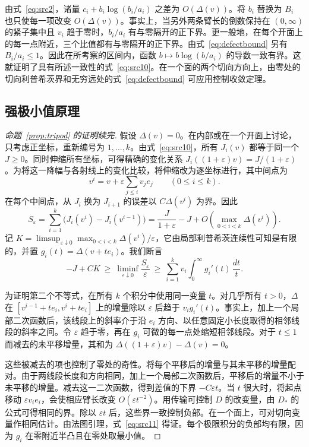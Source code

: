 由式~\eqref{eq:src2}，诸量 $c_i+b_i\log(b_i/a_i)$ 之差为 $O(\Delta(v))$。将 $b_i$ 替换为 $B_i$ 也只使每一项改变 $O(\Delta(v))$。事实上，当另外两条臂长的倒数保持在 $(0,\infty)$ 的紧子集中且 $v_i$ 趋于零时，$b_i/a_i$ 有与零隔开的正下界。更一般地，在每个开面上的每一点附近，三个比值都有与零隔开的正下界。由式~\eqref{eq:defectbound} 另有 $B_i/a_i\le1$。因此在所考察的区间内，函数 $b\mapsto b\log(b/a_i)$ 的导数一致有界。这就证明了具有所述一致性的式~\eqref{eq:src10}。在一个面的两个切向方向上，由零处的切向利普希茨界和无穷远处的式~\eqref{eq:defectbound} 可应用控制收敛定理。

\subsection{强极小值原理}

\begin{proof}[命题~\ref{prop:tripod} 的证明续完]
假设 $\Delta(v)=0$。在内部或在一个开面上讨论，只考虑正坐标，重新编号为 $1,\ldots,k$。由式~\eqref{eq:src10}，所有 $J_i(v)$ 都等于同一个 $J\ge0$。同时伸缩所有坐标，可得精确的变化关系 $J_i((1+\varepsilon)v)=J/(1+\varepsilon)$。为将这一降幅与各射线上的变化比较，将伸缩改为逐坐标进行，其中间点为
\[
          v^i=v+\varepsilon\sum_{j\le i}v_j e_j
               \qquad(0\le i\le k).
\]
在每个中间点，从 $J_i$ 换为 $J_{i+1}$ 的误差以 $C\Delta(v^i)$ 为界。因此
\[
 S_\varepsilon=\sum_{i=1}^k\big(J_i(v^i)-J_i(v^{i-1})\big)
   =\frac{J}{1+\varepsilon}-J+
                  O\!\left(\max_{0<i<k}\Delta(v^i)\right).
\]
记 $K=\limsup_{\varepsilon\downarrow0}
\max_{0<i<k}\Delta(v^i)/\varepsilon$，它由局部利普希茨连续性可知是有限的，并置 $g_i(t)=\Delta(v+te_i)$。我们断言
\begin{equation}\label{eq:src11}
 -J+CK\ \ge\ \liminf_{\varepsilon\downarrow0}
              \frac{S_\varepsilon}{\varepsilon}
        \ \ge\ \sum_{i=1}^k v_i\int_0^\infty g_i'(t)\,\frac{dt}{t}.
\end{equation}

为证明第二个不等式，在所有 $k$ 个积分中使用同一变量 $t$。对几乎所有 $t>0$，$\Delta$ 在 $[v^{i-1}+te_i,v^i+te_i]$ 上的增量除以 $\varepsilon$ 后趋于 $v_i g_i'(t)$。事实上，加上一个局部二次函数后，该线段上的斜率介于沿 $e_i$ 方向、以任意固定小长度取得的相邻线段的斜率之间。令 $\varepsilon$ 趋于零，再在 $g_i$ 可微的每一点处缩短相邻线段。对于 $t\le1$ 而减去的未平移增量，其和为 $\Delta((1+\varepsilon)v)-\Delta(v)=0$。

这些被减去的项也控制了零处的奇性。将每个平移后的增量与其未平移的增量配对。由于两线段长度和方向相同，加上一个局部二次函数后，平移后的增量不小于未平移的增量。减去这一二次函数，得到差值的下界 $-C\varepsilon t$。当 $t$ 很大时，将起点移动 $\varepsilon v_i e_i$，会使相应臂长改变 $O(\varepsilon t^{-2})$。用传输可控制 $D$ 的改变量，由 $D_*$ 的公式可得相同的界。除以 $\varepsilon t$ 后，这些界一致控制负部。在一个面上，可对切向变量作相同估计。由法图引理，式~\eqref{eq:src11} 得证。每个极限积分的负部均有限，因为 $g_i$ 在零附近半凸且在零处取最小值。


\end{proof}
